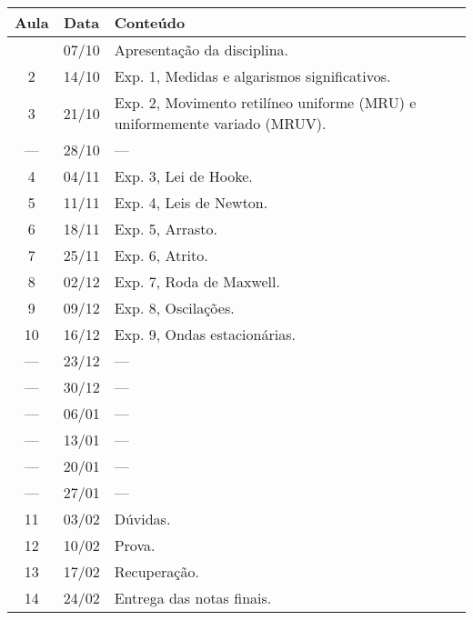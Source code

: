\begin{center}
\begin{longtable}{ccp{70mm}}
\toprule
Aula & Data & Conteúdo \\
\midrule
\endhead
\bottomrule
\endfoot
  1 & 07/10 & Apresentação da disciplina. \\
  2 & 14/10 & Exp. 1, Medidas e algarismos significativos. \\
  3 & 21/10 & Exp. 2, Movimento retilíneo uniforme (MRU) e uniformemente variado (MRUV). \\
--- & 28/10 & --- \\
  4 & 04/11 & Exp. 3, Lei de Hooke. \\
  5 & 11/11 & Exp. 4, Leis de Newton. \\
  6 & 18/11 & Exp. 5, Arrasto. \\
  7 & 25/11 & Exp. 6, Atrito. \\
  8 & 02/12 & Exp. 7, Roda de Maxwell. \\
  9 & 09/12 & Exp. 8, Oscilações. \\
 10 & 16/12 & Exp. 9, Ondas estacionárias. \\
--- & 23/12 & --- \\
--- & 30/12 & --- \\
--- & 06/01 & --- \\
--- & 13/01 & --- \\
--- & 20/01 & --- \\ 
--- & 27/01 & --- \\
 11 & 03/02 & Dúvidas. \\
 12 & 10/02 & Prova.\\
 13 & 17/02 & Recuperação.\\
 14 & 24/02 & Entrega das notas finais.
\end{longtable}
\end{center}

\clearpage

